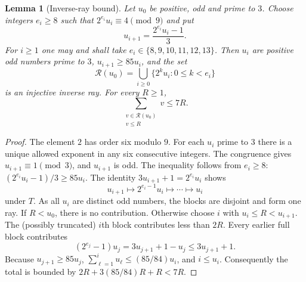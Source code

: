\documentclass[11pt,a4paper]{article}
\newtheorem{lemma}[theorem]{Lemma}
\begin{document}
\begin{lemma}[Inverse-ray bound]\label{lem:ray}
Let $u_0$ be positive, odd and prime to $3$. Choose integers $e_i\ge8$
such that $2^{e_i}u_i\equiv4\pmod9$ and put
\[
 u_{i+1}=\frac{2^{e_i}u_i-1}{3}.
\]
For $i\ge1$ one may and shall take $e_i\in\{8,9,10,11,12,13\}$.
Then $u_i$ are positive odd numbers prime to $3$,
$u_{i+1}\ge85u_i$, and the set
\[
 \mathcal R(u_0)=\bigcup_{i\ge0}
 \{2^ku_i:0\le k<e_i\}
\]
is an injective inverse ray. For every $R\ge1$,
\begin{equation}\label{eq:raybound}
\sum_{\substack{v\in\mathcal R(u_0)\\v\le R}}v\le7R.
\end{equation}
\end{lemma}
\begin{proof}
The element $2$ has order six modulo $9$. For each $u_i$ prime to $3$
there is a unique allowed exponent in any six consecutive integers.
The congruence gives $u_{i+1}\equiv1\pmod3$, and $u_{i+1}$ is odd.
The inequality follows from $e_i\ge8$:
$(2^{e_i}u_i-1)/3\ge85u_i$.
The identity $3u_{i+1}+1=2^{e_i}u_i$ shows
\[
 u_{i+1}\longmapsto 2^{e_i-1}u_i\longmapsto\cdots
 \longmapsto u_i
\]
under $T$. As all $u_i$ are distinct odd numbers, the blocks are
disjoint and form one ray.
If $R<u_0$, there is no contribution. Otherwise choose $i$ with
$u_i\le R<u_{i+1}$. The (possibly truncated) $i$th block contributes
less than $2R$. Every earlier full block contributes
\[
 (2^{e_j}-1)u_j=3u_{j+1}+1-u_j\le3u_{j+1}+1.
\]
Because $u_{j+1}\ge85u_j$,
$\sum_{\ell=1}^{i}u_\ell\le(85/84)u_i$, and $i\le u_i$.
Consequently the total is bounded by
$2R+3(85/84)R+R<7R$.
\end{proof}
\end{document}
